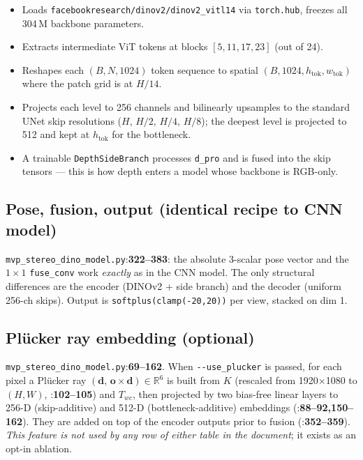 \documentclass[11pt]{article}
\newcommand{\fref}[2]{\texttt{\textcolor{filegray}{#1}}:\textbf{#2}}
\begin{document}
\begin{itemize}[leftmargin=2em]
  \item Loads \texttt{facebookresearch/dinov2/dinov2\_vitl14} via
        \texttt{torch.hub}, freezes all 304\,M backbone parameters.
  \item Extracts intermediate ViT tokens at blocks
        $[5,11,17,23]$ (out of 24).
  \item Reshapes each $(B,N,1024)$ token sequence to spatial
        $(B,1024,h_{\text{tok}},w_{\text{tok}})$ where the patch grid
        is at $H/14$.
  \item Projects each level to 256 channels and bilinearly upsamples to
        the standard UNet skip resolutions
        ($H,\,H/2,\,H/4,\,H/8$); the deepest level is projected to 512
        and kept at $h_{\text{tok}}$ for the bottleneck.
  \item A trainable \texttt{DepthSideBranch} processes \texttt{d\_pro}
        and is fused into the skip tensors --- this is how depth enters
        a model whose backbone is RGB-only.
\end{itemize}

\subsection{Pose, fusion, output (identical recipe to CNN model)}
\fref{mvp\_stereo\_dino\_model.py}{322--383}: the absolute 3-scalar pose
vector and the $1{\times}1$ \texttt{fuse\_conv} work \emph{exactly} as in
the CNN model. The only structural differences are the encoder
(DINOv2 + side branch) and the decoder (uniform 256-ch skips). Output
is \texttt{softplus(clamp(-20,20))} per view, stacked on dim 1.

\subsection{Plücker ray embedding (optional)}
\fref{mvp\_stereo\_dino\_model.py}{69--162}. When
\texttt{-{}-use\_plucker} is passed, for each pixel a Plücker ray
$(\mathbf{d},\,\mathbf{o}\times\mathbf{d})\in\mathbb{R}^6$ is built from
$K$ (rescaled from 1920$\times$1080 to $(H,W)$,
\fref{}{102--105}) and $T_{wc}$, then projected by two bias-free linear
layers to 256-D (skip-additive) and 512-D (bottleneck-additive)
embeddings
(\fref{}{88--92,150--162}). They are added on top of the encoder
outputs prior to fusion
(\fref{}{352--359}). \emph{This feature is not used by any row of either
table in the document}; it exists as an opt-in ablation.
\end{document}
